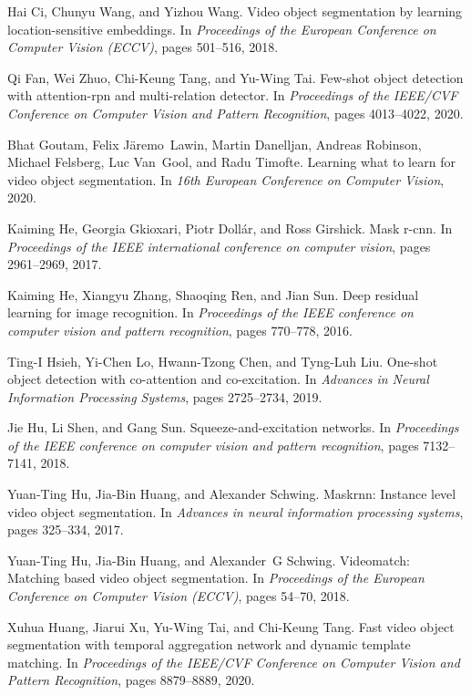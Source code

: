 \documentclass[final]{cvpr}
\begin{document}
{\begin{thebibliography}{10}
Hai Ci, Chunyu Wang, and Yizhou Wang.
\newblock Video object segmentation by learning location-sensitive embeddings.
\newblock In {\em Proceedings of the European Conference on Computer Vision
  (ECCV)}, pages 501--516, 2018.

Qi Fan, Wei Zhuo, Chi-Keung Tang, and Yu-Wing Tai.
\newblock Few-shot object detection with attention-rpn and multi-relation
  detector.
\newblock In {\em Proceedings of the IEEE/CVF Conference on Computer Vision and
  Pattern Recognition}, pages 4013--4022, 2020.

Bhat Goutam, Felix J{\"a}remo~Lawin, Martin Danelljan, Andreas Robinson,
  Michael Felsberg, Luc Van~Gool, and Radu Timofte.
\newblock Learning what to learn for video object segmentation.
\newblock In {\em 16th European Conference on Computer Vision}, 2020.

Kaiming He, Georgia Gkioxari, Piotr Doll{\'a}r, and Ross Girshick.
\newblock Mask r-cnn.
\newblock In {\em Proceedings of the IEEE international conference on computer
  vision}, pages 2961--2969, 2017.

Kaiming He, Xiangyu Zhang, Shaoqing Ren, and Jian Sun.
\newblock Deep residual learning for image recognition.
\newblock In {\em Proceedings of the IEEE conference on computer vision and
  pattern recognition}, pages 770--778, 2016.

Ting-I Hsieh, Yi-Chen Lo, Hwann-Tzong Chen, and Tyng-Luh Liu.
\newblock One-shot object detection with co-attention and co-excitation.
\newblock In {\em Advances in Neural Information Processing Systems}, pages
  2725--2734, 2019.

Jie Hu, Li Shen, and Gang Sun.
\newblock Squeeze-and-excitation networks.
\newblock In {\em Proceedings of the IEEE conference on computer vision and
  pattern recognition}, pages 7132--7141, 2018.

Yuan-Ting Hu, Jia-Bin Huang, and Alexander Schwing.
\newblock Maskrnn: Instance level video object segmentation.
\newblock In {\em Advances in neural information processing systems}, pages
  325--334, 2017.

Yuan-Ting Hu, Jia-Bin Huang, and Alexander~G Schwing.
\newblock Videomatch: Matching based video object segmentation.
\newblock In {\em Proceedings of the European Conference on Computer Vision
  (ECCV)}, pages 54--70, 2018.

Xuhua Huang, Jiarui Xu, Yu-Wing Tai, and Chi-Keung Tang.
\newblock Fast video object segmentation with temporal aggregation network and
  dynamic template matching.
\newblock In {\em Proceedings of the IEEE/CVF Conference on Computer Vision and
  Pattern Recognition}, pages 8879--8889, 2020.


\end{thebibliography}}
\end{document}
